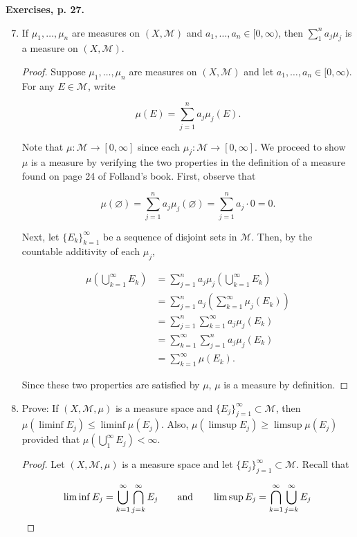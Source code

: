 \documentclass[11pt,oneside,english]{amsart}
\theoremstyle{definition}
\newcommand{\aspace}{\hspace{7mm}\text{and}\hspace{7mm}}
\newcommand{\MC}[1]{\mathcal{#1}}
\begin{document}
\textbf{Exercises, p. 27.}


\begin{enumerate}
\setcounter{enumi}{6}
\item If $\mu_1,\ldots, \mu_n$ are measures on $(X,\MC{M})$ and $a_1,\ldots,a_n\in[0,\infty)$, then $\sum_1^na_j\mu_j$ is a measure on $(X,\MC{M})$.

\begin{proof}
Suppose $\mu_1,\ldots, \mu_n$ are measures on $(X,\MC{M})$ and let $a_1,\ldots,a_n\in[0,\infty)$. For any $E\in\MC{M}$, write 

\[
\mu(E)=\sum_{j=1}^na_j\mu_j(E).
\]

Note that $\mu:\MC{M}\rightarrow[0,\infty]$ since each $\mu_j:\MC{M}\rightarrow[0,\infty]$. We proceed to show $\mu$ is a measure by verifying the two properties in the definition of a measure found on page 24 of Folland's book. First, observe that

\[
\mu(\varnothing)=\sum_{j=1}^na_j\mu_j(\varnothing)=\sum_{j=1}^na_j\cdot0=0.
\]

Next, let $\{E_k\}_{k=1}^\infty$ be a sequence of disjoint sets in $\MC{M}$. Then, by the countable additivity of each $\mu_j$,

\begin{align*}
\mu\left(\bigcup_{k=1}^\infty E_k\right)&=\sum_{j=1}^n a_j\mu_j\left(\bigcup_{k=1}^\infty E_k\right)\\[2mm]
&=\sum_{j=1}^n a_j\left(\sum_{k=1}^\infty\mu_j(E_k)\right)\\[2mm]
&=\sum_{j=1}^n\sum_{k=1}^\infty a_j\mu_j(E_k)\\[2mm]
&=\sum_{k=1}^\infty\sum_{j=1}^n a_j\mu_j(E_k)\\[2mm]
&=\sum_{k=1}^\infty\mu(E_k).
\end{align*}

Since these two properties are satisfied by $\mu$, $\mu$ is a measure by definition.
\end{proof}

\item Prove: If $(X,\MC{M},\mu)$ is a measure space and $\{E_j\}_{j=1}^\infty\subset\MC{M}$, then $\mu(\liminf E_j)\leq\liminf \mu(E_j)$. Also, $\mu(\limsup E_j)\geq \limsup \mu(E_j)$ provided that $\mu\left(\bigcup_1^\infty E_j\right)<\infty$.

\begin{proof}
Let $(X,\MC{M},\mu)$ is a measure space and let $\{E_j\}_{j=1}^\infty\subset\MC{M}$. Recall that 

\[
\liminf E_j=\bigcup_{k=1}^\infty\bigcap_{j=k}^\infty E_j \aspace \limsup E_j = \bigcap_{k=1}^\infty\bigcup_{j=k}^\infty E_j
\]


\end{proof}
\end{enumerate}
\end{document}
